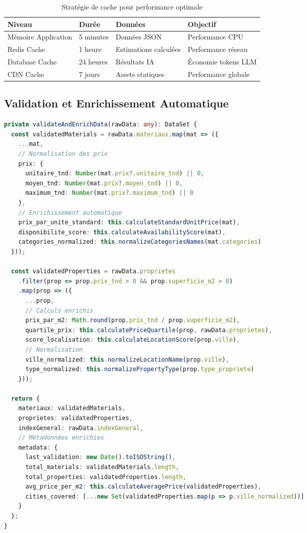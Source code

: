 \begin{table}[H]
\centering
\caption{Stratégie de cache pour performance optimale}
\begin{tabular}{|l|l|l|l|}
\hline
\textbf{Niveau} & \textbf{Durée} & \textbf{Données} & \textbf{Objectif} \\
\hline
Mémoire Application & 5 minutes & Données JSON & Performance CPU \\
\hline
Redis Cache & 1 heure & Estimations calculées & Performance réseau \\
\hline
Database Cache & 24 heures & Résultats IA & Économie tokens LLM \\
\hline
CDN Cache & 7 jours & Assets statiques & Performance globale \\
\hline
\end{tabular}
\end{table}

\subsection{Validation et Enrichissement Automatique}

\begin{lstlisting}[language=TypeScript, caption=Validation et enrichissement des données]
private validateAndEnrichData(rawData: any): DataSet {
  const validatedMaterials = rawData.materiaux.map(mat => ({
    ...mat,
    // Normalisation des prix
    prix: {
      unitaire_tnd: Number(mat.prix?.unitaire_tnd) || 0,
      moyen_tnd: Number(mat.prix?.moyen_tnd) || 0,
      maximum_tnd: Number(mat.prix?.maximum_tnd) || 0
    },
    // Enrichissement automatique
    prix_par_unite_standard: this.calculateStandardUnitPrice(mat),
    disponibilite_score: this.calculateAvailabilityScore(mat),
    categories_normalized: this.normalizeCategoriesNames(mat.categories)
  }));
  
  const validatedProperties = rawData.proprietes
    .filter(prop => prop.prix_tnd > 0 && prop.superficie_m2 > 0)
    .map(prop => ({
      ...prop,
      // Calculs enrichis
      prix_par_m2: Math.round(prop.prix_tnd / prop.superficie_m2),
      quartile_prix: this.calculatePriceQuartile(prop, rawData.proprietes),
      score_localisation: this.calculateLocationScore(prop.ville),
      // Normalisation
      ville_normalized: this.normalizeLocationName(prop.ville),
      type_normalized: this.normalizePropertyType(prop.type_propriete)
    }));
  
  return {
    materiaux: validatedMaterials,
    proprietes: validatedProperties,
    indexGeneral: rawData.indexGeneral,
    // Métadonnées enrichies
    metadata: {
      last_validation: new Date().toISOString(),
      total_materials: validatedMaterials.length,
      total_properties: validatedProperties.length,
      avg_price_per_m2: this.calculateAveragePrice(validatedProperties),
      cities_covered: [...new Set(validatedProperties.map(p => p.ville_normalized))]
    }
  };
}
\end{lstlisting}


